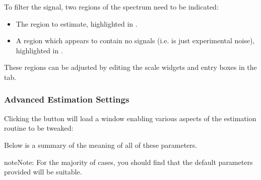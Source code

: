 \documentclass[letterpaper,10pt,english]{sphinxmanual}
\begin{document}
\sphinxAtStartPar
To filter the signal, two regions of the spectrum need to be indicated:
\begin{itemize}
\item {} 
\sphinxAtStartPar
The region to estimate, highlighted in .

\item {} 
\sphinxAtStartPar
A region which appears to contain no signals
(i.e. is just experimental noise), highlighted in .

\end{itemize}

\sphinxAtStartPar
These regions can be adjusted by editing the scale widgets and entry boxes
in the  tab.


\subsubsection{Advanced Estimation Settings}
\label{\detokenize{gui/usage/setup:advanced-estimation-settings}}
\sphinxAtStartPar
Clicking the  button will load a window enabling various
aspects of the estimation routine to be tweaked:


\sphinxAtStartPar
Below is a summary of the meaning of all of these parameters.

\begin{sphinxadmonition}{note}{Note:}
\sphinxAtStartPar
For the majority of cases, you should find that the default parameters
provided will be suitable.
\end{sphinxadmonition}
\end{document}
